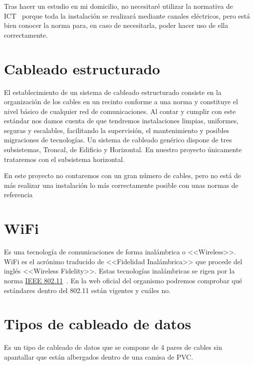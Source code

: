 Tras hacer un estudio en mi domicilio, no necesitaré utilizar la normativa de ICT~\cite{manual:ICT} porque toda la instalación se realizará mediante canales eléctricos, pero está bien conocer la norma para, en caso de necesitarla, poder hacer uso de ella correctamente.

\section{Cableado estructurado}\label{concepto:Cableado_estructurado}
El establecimiento de un sistema de cableado estructurado consiste en la organización de los cables en un recinto conforme a una norma y constituye el nivel básico de cualquier red de comunicaciones.
Al contar y cumplir con este estándar nos damos cuenta de que tendremos instalaciones limpias, uniformes, seguras y escalables, facilitando la supervisión, el mantenimiento y posibles migraciones de tecnologías.
Un sistema de cableado genérico dispone de tres subsistemas, Troncal, de Edificio y Horizontal. En nuestro proyecto únicamente trataremos con el subsistema horizontal.

En este proyecto no contaremos con un gran número de cables, pero no está de más realizar una instalación lo más correctamente posible con unas normas de referencia

\section{WiFi}\label{concepto:WIFI}
Es una tecnología de comunicaciones de forma inalámbrica o <<Wireless>>. WiFi es el acrónimo traducido de <<Fidelidad Inalámbrica>> que procede del inglés <<Wireless Fidelity>>.
Estas tecnologías inalámbricas se rigen por la norma \underline{IEEE 802.11}~\cite{manual:IEEE802.11}.
En la web oficial del organismo podremos comprobar qué estándares dentro del 802.11 están vigentes y cuáles no.

\section{Tipos de cableado de datos}\label{concepto:UTP}
Es un tipo de cableado de datos que se compone de 4 pares de cables sin apantallar que están albergados dentro de una camisa de PVC.

